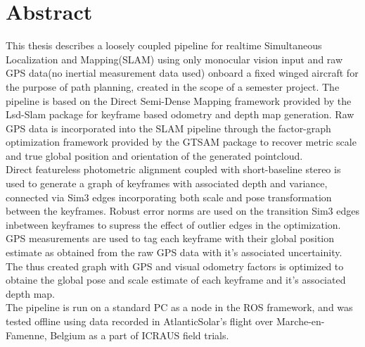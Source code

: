 \chapter*{Abstract}

This thesis describes a loosely coupled pipeline for realtime Simultaneous Localization and Mapping(SLAM) using only monocular vision input and raw GPS data(no inertial measurement data used) onboard a fixed winged aircraft for the purpose of path planning, created in the scope of a semester project. The pipeline is based on the Direct Semi-Dense Mapping framework provided by the Lsd-Slam package for keyframe based odometry and depth map generation. Raw GPS data is incorporated into the SLAM pipeline through the factor-graph optimization framework provided by the GTSAM package to recover metric scale and true global position and orientation of the generated pointcloud. \\
Direct featureless photometric alignment coupled with short-baseline stereo is used to generate a graph of keyframes with associated depth and variance, connected via Sim3 edges incorporating both scale and pose transformation between the keyframes. Robust error norms are used on the transition Sim3 edges inbetween keyframes to supress the effect of outlier edges in the optimization. GPS measurements are used to tag each keyframe with their global position estimate as obtained from the raw GPS data with it's associated uncertainity. The thus created graph with GPS and visual odometry factors is optimized to obtaine the global pose and scale estimate of each keyframe and it's associated depth map.\\
The pipeline is run on a standard PC as a node in the ROS framework, and was tested offline using data recorded in AtlanticSolar’s flight over Marche-en-Famenne, Belgium as a part of ICRAUS field trials.